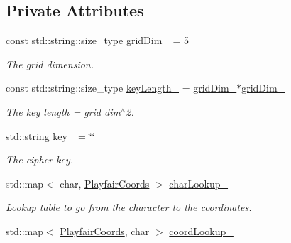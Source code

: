 \subsection*{Private Attributes}
\begin{DoxyCompactItemize}
\item 
const std\+::string\+::size\+\_\+type \hyperlink{class_playfair_cipher_ae010f278b11579565f7166904d4c029a}{grid\+Dim\+\_\+} = 5\hypertarget{class_playfair_cipher_ae010f278b11579565f7166904d4c029a}{}\label{class_playfair_cipher_ae010f278b11579565f7166904d4c029a}

\begin{DoxyCompactList}\small\item\em The grid dimension. \end{DoxyCompactList}\item 
const std\+::string\+::size\+\_\+type \hyperlink{class_playfair_cipher_a1a3293fccc4e72fc1bd8e77142c6ae45}{key\+Length\+\_\+} = \hyperlink{class_playfair_cipher_ae010f278b11579565f7166904d4c029a}{grid\+Dim\+\_\+}$\ast$\hyperlink{class_playfair_cipher_ae010f278b11579565f7166904d4c029a}{grid\+Dim\+\_\+}\hypertarget{class_playfair_cipher_a1a3293fccc4e72fc1bd8e77142c6ae45}{}\label{class_playfair_cipher_a1a3293fccc4e72fc1bd8e77142c6ae45}

\begin{DoxyCompactList}\small\item\em The key length = grid dim$^\wedge$2. \end{DoxyCompactList}\item 
std\+::string \hyperlink{class_playfair_cipher_a4f7f68741424613b7200d3f34f963385}{key\+\_\+} = \char`\"{}\char`\"{}\hypertarget{class_playfair_cipher_a4f7f68741424613b7200d3f34f963385}{}\label{class_playfair_cipher_a4f7f68741424613b7200d3f34f963385}

\begin{DoxyCompactList}\small\item\em The cipher key. \end{DoxyCompactList}\item 
std\+::map$<$ char, \hyperlink{class_playfair_cipher_a8e1ee213c8affc4e64fd29fd236a42ee}{Playfair\+Coords} $>$ \hyperlink{class_playfair_cipher_a1e91611ed184fb0354a523efc6909724}{char\+Lookup\+\_\+}\hypertarget{class_playfair_cipher_a1e91611ed184fb0354a523efc6909724}{}\label{class_playfair_cipher_a1e91611ed184fb0354a523efc6909724}

\begin{DoxyCompactList}\small\item\em Lookup table to go from the character to the coordinates. \end{DoxyCompactList}\item 
std\+::map$<$ \hyperlink{class_playfair_cipher_a8e1ee213c8affc4e64fd29fd236a42ee}{Playfair\+Coords}, char $>$ \hyperlink{class_playfair_cipher_a1d772016641ca0ab178b25f24c996419}{coord\+Lookup\+\_\+}\hypertarget{class_playfair_cipher_a1d772016641ca0ab178b25f24c996419}{}\label{class_playfair_cipher_a1d772016641ca0ab178b25f24c996419}


\end{DoxyCompactItemize}
